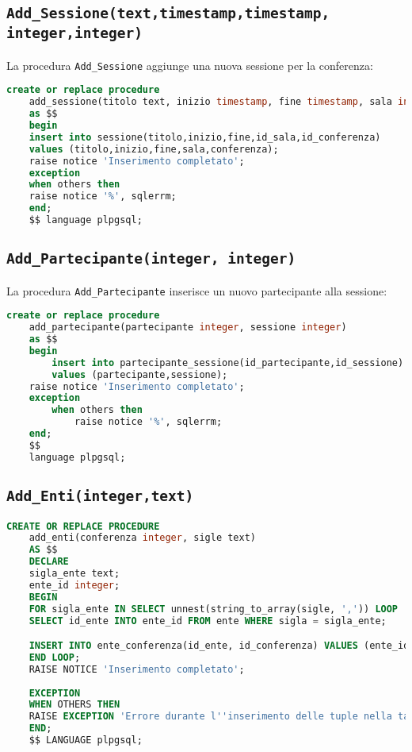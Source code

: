 \subsection{\texttt{Add\_Sessione(text,timestamp,timestamp, integer,integer)}}
La procedura \texttt{Add\_Sessione} aggiunge una nuova sessione per la conferenza:
\begin{lstlisting}[language=SQL, style=mystyle]
	create or replace procedure 
	add_sessione(titolo text, inizio timestamp, fine timestamp, sala integer, conferenza integer)
	as $$
	begin
	insert into sessione(titolo,inizio,fine,id_sala,id_conferenza)
	values (titolo,inizio,fine,sala,conferenza);
	raise notice 'Inserimento completato';
	exception
	when others then
	raise notice '%', sqlerrm;
	end;
	$$ language plpgsql;
\end{lstlisting}
\subsection{\texttt{Add\_Partecipante(integer, integer)}}
La procedura \texttt{Add\_Partecipante} inserisce un nuovo partecipante alla sessione:
\begin{lstlisting}[language=SQL, style=mystyle]
	create or replace procedure 
	add_partecipante(partecipante integer, sessione integer)
	as $$
	begin
		insert into partecipante_sessione(id_partecipante,id_sessione)
		values (partecipante,sessione);
	raise notice 'Inserimento completato';
	exception
		when others then
			raise notice '%', sqlerrm;
	end;
	$$ 
	language plpgsql;
\end{lstlisting}
\subsection{\texttt{Add\_Enti(integer,text)}}
\begin{lstlisting}[language=SQL,style=mystyle]
	CREATE OR REPLACE PROCEDURE 
	add_enti(conferenza integer, sigle text)
	AS $$
	DECLARE
	sigla_ente text;
	ente_id integer;
	BEGIN
	FOR sigla_ente IN SELECT unnest(string_to_array(sigle, ',')) LOOP
	SELECT id_ente INTO ente_id FROM ente WHERE sigla = sigla_ente;

	INSERT INTO ente_conferenza(id_ente, id_conferenza) VALUES (ente_id, conferenza);
	END LOOP;
	RAISE NOTICE 'Inserimento completato';
	
	EXCEPTION
	WHEN OTHERS THEN
	RAISE EXCEPTION 'Errore durante l''inserimento delle tuple nella tabella ente_conferenza: %', SQLERRM;
	END;
	$$ LANGUAGE plpgsql;
\end{lstlisting}
